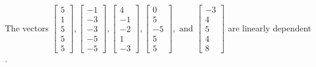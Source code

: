 \begin{exercise}
\begin{exerciseStatement}
  \end{exerciseStatement}
  \begin{exerciseAnswer}
   The vectors \(\left[\begin{array}{r}
5 \\
1 \\
5 \\
5 \\
5
\end{array}\right] , \left[\begin{array}{r}
-1 \\
-3 \\
-3 \\
-5 \\
-5
\end{array}\right] , \left[\begin{array}{r}
4 \\
-1 \\
-2 \\
1 \\
-3
\end{array}\right] , \left[\begin{array}{r}
0 \\
5 \\
-5 \\
5 \\
5
\end{array}\right] , \text{ and } \left[\begin{array}{r}
-3 \\
4 \\
5 \\
4 \\
8
\end{array}\right]\) are 
  	 linearly dependent  .
  


  \end{exerciseAnswer}
\end{exercise}